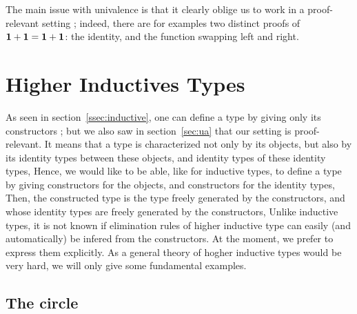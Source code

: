 The main issue with univalence is that it clearly oblige us to work in
a proof-relevant setting ; indeed, there are for examples two distinct
proofs of $\mathbf{1}+\mathbf{1} = \mathbf{1}+\mathbf{1}$: the identity, and the function
swapping left and right.

\section{Higher Inductives Types}
\label{sec:hit}

As seen in section~\ref{ssec:inductive}, one can define a type by
giving only its constructors ; but we also saw in section~\ref{sec:ua}
that our setting is proof-relevant. It means that a type is
characterized not only by its objects, but also by its identity types
between these objects, and identity types of these identity types,
\etc{}
Hence, we would like to be able, like for inductive types, to define a
type by giving constructors for the objects, and constructors for the
identity types, \etc{} Then, the constructed type is the type freely
generated by the constructors, and whose identity types are freely
generated by the constructors, \etc{}
Unlike inductive types, it is not known if elimination rules of higher
inductive type can easily (and automatically) be infered from the
constructors. At the moment, we prefer to express them
explicitly. As a general theory of hogher inductive types would be
very hard, we will only give some fundamental examples.


\subsection{The circle}
\label{ssec:S1}

